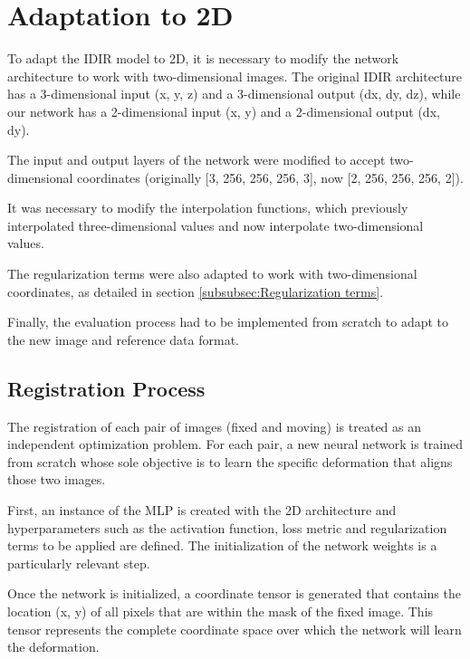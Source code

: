 \section{Adaptation to 2D}
\label{sec:Adaptation to 2D}

To adapt the IDIR model to 2D, it is necessary to modify the network architecture to work with two-dimensional images.
The original IDIR architecture has a 3-dimensional input (x, y, z) and a 3-dimensional output (dx, dy, dz),
while our network has a 2-dimensional input (x, y) and a 2-dimensional output (dx, dy).

The input and output layers of the network were modified to accept two-dimensional coordinates (originally [3, 256, 256, 256, 3], now [2, 256, 256, 256, 2]).

It was necessary to modify the interpolation functions, which previously interpolated three-dimensional values and now interpolate two-dimensional values.

The regularization terms were also adapted to work with two-dimensional coordinates, as detailed in section \ref{subsubsec:Regularization terms}.

Finally, the evaluation process had to be implemented from scratch to adapt to the new image and reference data format.

\subsection{Registration Process}
\label{subsec:Registration Process}

The registration of each pair of images (fixed and moving) is treated as an independent optimization problem. For each pair, a new neural network is trained from scratch whose sole objective is to learn the specific deformation that aligns those two images.

First, an instance of the MLP is created with the 2D architecture and hyperparameters such as the activation function, loss metric and regularization terms to be applied are defined. The initialization of the network weights is a particularly relevant step.

Once the network is initialized, a coordinate tensor is generated that contains the location (x, y) of all pixels that are within the mask of the fixed image. This tensor represents the complete coordinate space over which the network will learn the deformation.


